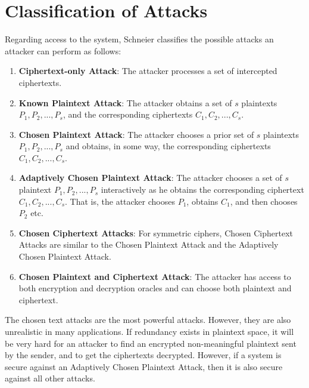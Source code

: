 \section{Classification of Attacks}
Regarding access to the system, Schneier classifies the possible attacks an attacker can perform as follows: \cite{schneier1996applied}
\begin{enumerate}
	\item \textbf{Ciphertext-only Attack}: The attacker processes a set of intercepted ciphertexts.
	\item \textbf{Known Plaintext Attack}: The attacker obtains a set of $s$ plaintexts $P_{1},P_{2},...,P_{s}$, and the corresponding ciphertexts $C_{1},C_{2},...,C_{s}$.
	\item \textbf{Chosen Plaintext Attack}: The attacker chooses a prior set of $s$ plaintexts $P_{1},P_{2},...,P_{s}$ and obtains, in some way, the corresponding ciphertexts $C_{1},C_{2},...,C_{s}$.
	\item \textbf{Adaptively Chosen Plaintext Attack}: The attacker chooses a set of $s$ plaintext $P_{1},P_{2},...,P_{s}$ interactively as he obtains the corresponding ciphertext $C_{1},C_{2},...,C_{s}$. That is, the attacker chooses $P_{1}$, obtains $C_{1}$, and then chooses $P_{2}$ etc.
	\item \textbf{Chosen Ciphertext Attacks}: For symmetric ciphers, Chosen Ciphertext Attacks are similar to the Chosen Plaintext Attack and the Adaptively Chosen Plaintext Attack.
	\item \textbf{Chosen Plaintext and Ciphertext Attack}: The attacker has access to both encryption and decryption oracles and can choose both plaintext and ciphertext.
\end{enumerate}

The chosen text attacks are the most powerful attacks. However, they are also unrealistic in many applications. If redundancy exists in plaintext space, it will be very hard for an attacker to find an encrypted non-meaningful plaintext sent by the sender, and to get the ciphertexts decrypted. However, if a system is secure against an Adaptively Chosen Plaintext Attack, then it is also secure against all other attacks.

